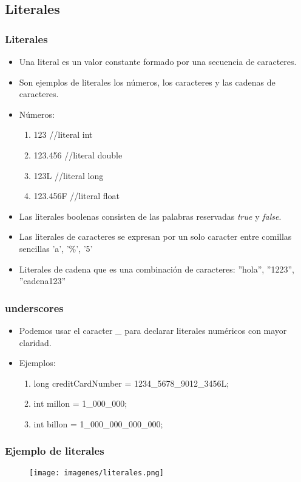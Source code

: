 \documentclass{beamer}
\begin{document}
\subsection{Literales}
\begin{frame}
\frametitle{Literales}
\begin{itemize}[<+-| alert@+>]
\item Una literal es un valor constante formado por una secuencia de caracteres.
\item Son ejemplos de literales los números, los caracteres y las cadenas de caracteres. 
\item Números:
\begin{enumerate}
\item 123 //literal int
\item 123.456 //literal double
\item 123L //literal long
\item 123.456F //literal float
\end{enumerate}
\item Las literales boolenas consisten de las palabras reservadas \emph{true} y \emph{false}. 
\item Las literales de caracteres se expresan por un solo caracter entre comillas sencillas 'a', '\%', '5'
\item Literales de cadena que es una combinación de caracteres: ''hola'', ''1223'', ''cadena123''
\end{itemize}
\pause
\end{frame}

\begin{frame}
\frametitle{underscores}
\begin{itemize}[<+-| alert@+>]
\item Podemos usar el caracter \emph{\_} para declarar literales numéricos con mayor claridad.
\item Ejemplos:
\begin{enumerate}
\item long creditCardNumber = 1234\_5678\_9012\_3456L;
\item int millon = 1\_000\_000;
\item int billon = 1\_000\_000\_000\_000;
\end{enumerate}
\end{itemize}
\pause
\end{frame}

\begin{frame}
\frametitle{Ejemplo de literales}
\begin{figure}
\texttt{[image: imagenes/literales.png]}
\end{figure}
\end{frame}
\end{document}
